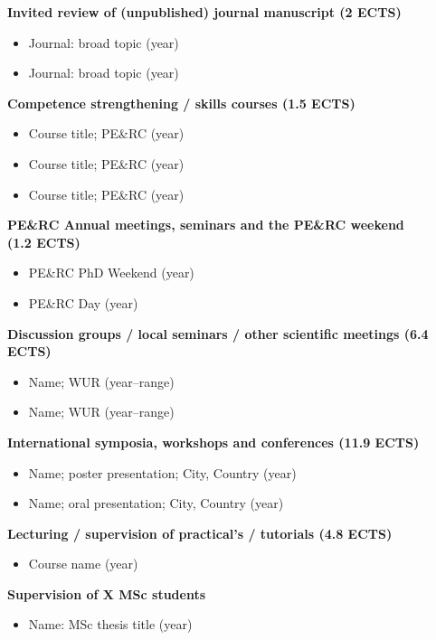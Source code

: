 \textbf{Invited review of (unpublished) journal manuscript (2 ECTS)}
\begin{itemize}[nolistsep]
    \item Journal: broad topic (year)
    \item Journal: broad topic (year)
\end{itemize}

\textbf{Competence strengthening / skills courses (1.5 ECTS)}
\begin{itemize}[nolistsep]
    \item Course title; PE\&RC (year)
    \item Course title; PE\&RC (year)
    \item Course title; PE\&RC (year)
\end{itemize}

\textbf{PE\&RC Annual meetings, seminars and the PE\&RC weekend \\ (1.2 ECTS)}
\begin{itemize}[nolistsep]
    \item PE\&RC PhD Weekend (year)
    \item PE\&RC Day (year)
\end{itemize}

\textbf{Discussion groups / local seminars / other scientific meetings (6.4 ECTS)}
\begin{itemize}[nolistsep]
    \item Name; WUR (year--range)
    \item Name; WUR (year--range)
\end{itemize}

\textbf{International symposia, workshops and conferences (11.9 ECTS)}
\begin{itemize}[nolistsep]
    \item Name; poster presentation; City, Country (year)
    \item Name; oral presentation; City, Country (year)
\end{itemize}

\textbf{Lecturing / supervision of practical’s / tutorials (4.8 ECTS)}
\begin{itemize}[nolistsep]
    \item Course name (year)
\end{itemize}

\textbf{Supervision of X MSc students}
\begin{itemize}[nolistsep]
    \item Name: MSc thesis title (year)
\end{itemize}

